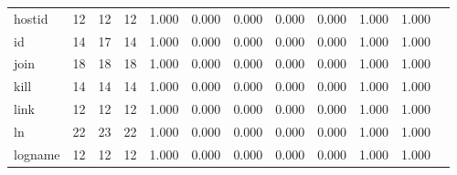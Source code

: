 \begin{longtable}{lp{1.00cm}p{1.00cm}p{1.00cm}p{1.00cm}p{1.00cm}p{1.00cm}p{1.00cm}p{1.00cm}p{1.00cm}p{1.00cm}p{1.00cm}}
hostid    &                           12 &                 12 &                                12 &                                      1.000 &                                  0.000 &                                        0.000 &                             0.000 &                                   0.000 &                        1.000 &                                        1.000 \\
id        &                           14 &                 17 &                                14 &                                      1.000 &                                  0.000 &                                        0.000 &                             0.000 &                                   0.000 &                        1.000 &                                        1.000 \\
join      &                           18 &                 18 &                                18 &                                      1.000 &                                  0.000 &                                        0.000 &                             0.000 &                                   0.000 &                        1.000 &                                        1.000 \\
kill      &                           14 &                 14 &                                14 &                                      1.000 &                                  0.000 &                                        0.000 &                             0.000 &                                   0.000 &                        1.000 &                                        1.000 \\
link      &                           12 &                 12 &                                12 &                                      1.000 &                                  0.000 &                                        0.000 &                             0.000 &                                   0.000 &                        1.000 &                                        1.000 \\
ln        &                           22 &                 23 &                                22 &                                      1.000 &                                  0.000 &                                        0.000 &                             0.000 &                                   0.000 &                        1.000 &                                        1.000 \\
logname   &                           12 &                 12 &                                12 &                                      1.000 &                                  0.000 &                                        0.000 &                             0.000 &                                   0.000 &                        1.000 &                                        1.000 \\

\end{longtable}
